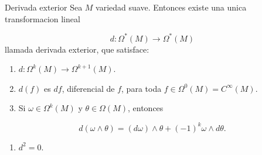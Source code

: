 \begin{booktheorem}{Derivada exterior}
Sea $M$ variedad suave. Entonces existe una unica transformacion lineal

\[
d:\Omega^*(M)\to\Omega^*(M)
\]
llamada derivada exterior, que satisface:

\begin{enumerate}
\item $d:\Omega^k(M)\to\Omega^{k+1}(M)$.
\item $d(f)$ es $df$, diferencial de $f$, para toda $f\in\Omega^0(M)=C^\infty(M)$.
\item Si $\omega\in\Omega^k(M)$ y $\theta\in\Omega(M)$, entonces
\end{enumerate}
\[
d(\omega\wedge\theta)=(d\omega)\wedge\theta+(-1)^k\omega\wedge d\theta.
\]
\begin{enumerate}[start=4]
\item $d^2=0$.
\end{enumerate}
\end{booktheorem}
